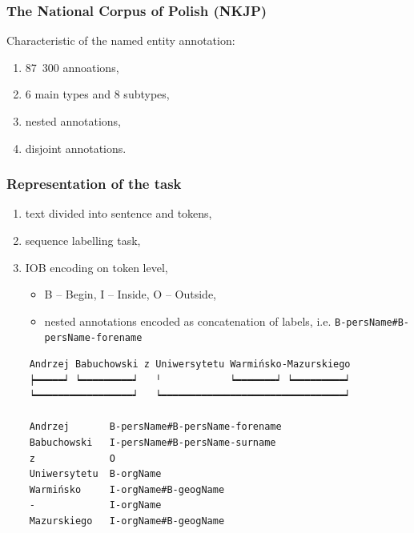 \documentclass[Warsaw]{beamer}
\begin{document}
\begin{frame}
    \frametitle{The National Corpus of Polish (NKJP)}
    
    Characteristic of the named entity annotation:
    \begin{enumerate}
        \item 87~300 annoations,
        \item 6 main types and 8 subtypes,
        \item nested annotations,
        \item disjoint annotations.
    \end{enumerate}
    
\end{frame}


\begin{frame}[fragile]
    \frametitle{Representation of the task}
    
    \begin{enumerate}
        \item text divided into sentence and tokens,
        \item sequence labelling task,
        \item IOB encoding on token level,
            \begin{itemize}
                \item B -- Begin, I -- Inside, O -- Outside,
                \item nested annotations encoded as concatenation of labels, i.e. \verb|B-persName#B-persName-forename|
            \end{itemize}
    \end{enumerate}
    
    \scriptsize
    \begin{verbatim}
    Andrzej Babuchowski z Uniwersytetu Warmińsko-Mazurskiego
    ┝━━━━━┙ ┕━━━━━━━━━┙   ╵            ┕━━━━━━━┙ ┕━━━━━━━━━┙
    ┕━━━━━━━━━━━━━━━━━┙   ┕━━━━━━━━━━━━━━━━━━━━━━━━━━━━━━━━┙
    
    Andrzej       B-persName#B-persName-forename
    Babuchowski   I-persName#B-persName-surname
    z             O
    Uniwersytetu  B-orgName
    Warmińsko     I-orgName#B-geogName
    -             I-orgName
    Mazurskiego   I-orgName#B-geogName
    \end{verbatim}
    
\end{frame}

\end{document}
